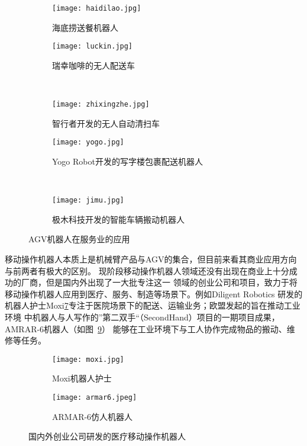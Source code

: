 \begin{figure}
\centering
\begin{subfigure}{.5\textwidth}
  \centering
  \texttt{[image: haidilao.jpg]}
  \caption{海底捞送餐机器人}
  \label{fig:haidilao}
\end{subfigure}%
\begin{subfigure}{.5\textwidth}
  \centering
  \texttt{[image: luckin.jpg]}
  \caption{瑞幸咖啡的无人配送车}
  \label{fig:luckin}
\end{subfigure}%
\\
\begin{subfigure}{.5\textwidth}
  \centering
  \texttt{[image: zhixingzhe.jpg]}
  \caption{智行者开发的无人自动清扫车}
  \label{fig:zhixingzhe}
\end{subfigure}%
\begin{subfigure}{.5\textwidth}
  \centering
  \texttt{[image: yogo.jpg]}
  \caption{Yogo Robot开发的写字楼包裹配送机器人}
  \label{fig:yogo}
\end{subfigure}%
\\
\begin{subfigure}{.5\textwidth}
  \centering
  \texttt{[image: jimu.jpg]}
  \caption{极木科技开发的智能车辆搬动机器人}
  \label{fig:jimu}
\end{subfigure}%
\caption{AGV机器人在服务业的应用}
\end{figure}


移动操作机器人本质上是机械臂产品与AGV的集合，但目前来看其商业应用方向与前两者有极大的区别。
现阶段移动操作机器人领域还没有出现在商业上十分成功的厂商，但是国内外出现了一大批专注这一
领域的创业公司和项目，致力于将移动操作机器人应用到医疗、服务、制造等场景下。例如Diligent Robotics
研发的机器人护士Moxi\ref{fig:moxi}专注于医院场景下的配送、运输业务；欧盟发起的旨在推动工业环境
中机器人与人写作的”第二双手“（SecondHand）项目的一期项目成果，AMRAR-6机器人（如图~\ref{fig:armar6}）
能够在工业环境下与工人协作完成物品的搬动、维修等任务。

\begin{figure}
\centering
\begin{subfigure}{.5\textwidth}
  \centering
  \texttt{[image: moxi.jpg]}
  \caption{Moxi机器人护士}
  \label{fig:moxi}
\end{subfigure}%
\begin{subfigure}{.5\textwidth}
  \centering
  \texttt{[image: armar6.jpeg]}
  \caption{ARMAR-6仿人机器人}
  \label{fig:armar6}
\end{subfigure}%
\caption{国内外创业公司研发的医疗移动操作机器人}
\end{figure}

